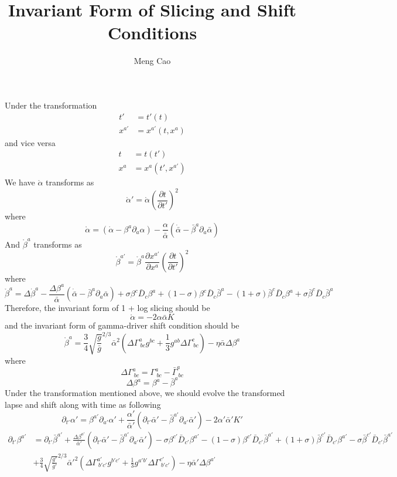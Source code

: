 \documentclass{article}
\begin{document}
\title{Invariant Form of Slicing and Shift Conditions}
\author{Meng Cao}
\maketitle
Under the transformation
\begin{align*}
t' &= t'(t)\\
x^{a'} &= x^{a'}(t,x^{a})
\end{align*}
and vice versa
\begin{align*}
t & = t(t')\\
x^{a} & = x^{a}(t',x^{a'})
\end{align*}
We have $\mathring{\alpha}$ transforms as
\[
\mathring{\alpha}' = \mathring{\alpha}(\frac{\partial t}{\partial t'})^{2}
\]
where
\[
\mathring{\alpha} = ({\dot \alpha} - \beta^{a}\partial_{a}\alpha) - \frac{\alpha}{{\bar \alpha}}({\dot {\bar \alpha}} - {\bar \beta}^{a}\partial_{a}{\bar \alpha})
\]
And $\mathring{\beta}^{a}$ transforms as
\[
\mathring{\beta}^{a'} = \mathring{\beta}^{a}\frac{\partial x^{a'}}{\partial x^{a}}(\frac{\partial t}{\partial t'})^{2}
\]
where
\[
\mathring{\beta}^{a} =  \Delta {\dot \beta}^{a} -\frac{\Delta \beta^{a}}{{\bar \alpha}}({\dot {\bar \alpha}} - {\bar \beta}^{a}\partial_{a}{\bar \alpha})+ \sigma \beta^{c}{\bar D}_{c}\beta^{a} + (1 - \sigma)\beta^{c}{\bar D}_{c}{\bar \beta}^{a} - (1 + \sigma){\bar \beta}^{c}{\bar D}_{c}\beta^{a} + \sigma{\bar \beta}^{c}{\bar D}_{c}{\bar \beta}^{a}
\]
Therefore, the invariant form of 1 + log slicing should be
\[
\mathring{\alpha} = -2\alpha{\bar \alpha}K
\]
and the invariant form of gamma-driver shift condition should be
\[
\mathring{\beta}^{a} = \frac{3}{4}\sqrt{\frac{g}{{\bar g}}}^{2/3}{\bar \alpha}^{2}(\Delta \Gamma^{a}_{~bc}g^{bc} + \frac{1}{3}g^{ab}\Delta\Gamma^{c}_{~bc}) - \eta {\bar \alpha}\Delta\beta^{a} 
\]
where
\[
\Delta \Gamma^{a}_{~bc} = \Gamma^{a}_{~bc} - {\bar \Gamma}^{a}_{~bc}
\]
\[
\Delta \beta^{a} = \beta^{a} - {\bar \beta}^{a}
\]
Under the transformation mentioned above, we should evolve the transformed lapse and shift along with time as following
\[
\partial_{t'}\alpha' = \beta^{a'}\partial_{a'}\alpha' + \frac{\alpha'}{{\bar \alpha}'}(\partial_{t'}{\bar \alpha}' - {\bar \beta}^{a'}\partial_{a'}{\bar \alpha}') - 2\alpha'{\bar \alpha}'K'
\]
\begin{align*}
\partial_{t'}\beta^{a'} & = \partial_{t'}{\bar \beta}^{a'} + \frac{\Delta \beta^{a'}}{{\bar \alpha}'}(\partial_{t'} {\bar \alpha}' - {\bar \beta}^{a'}\partial_{a'}{\bar \alpha}') - \sigma \beta^{c'}{\bar D}_{c'}\beta^{a'} - (1 - \sigma)\beta^{c'}{\bar D}_{c'}{\bar \beta}^{a'} + (1 + \sigma){\bar \beta}^{c'}{\bar D}_{c'}\beta^{a'} - \sigma{\bar \beta}^{c'}{\bar D}_{c'}{\bar \beta}^{a'}\\
&+ \frac{3}{4}\sqrt{\frac{g'}{{\bar g}'}}^{2/3}{\bar \alpha}'^{2}(\Delta \Gamma^{a'}_{~b'c'}g^{b'c'} + \frac{1}{3}g^{a'b'}\Delta\Gamma^{c'}_{~b'c'}) - \eta {\bar \alpha}'\Delta\beta^{a'} 
\end{align*}
\end{document}

